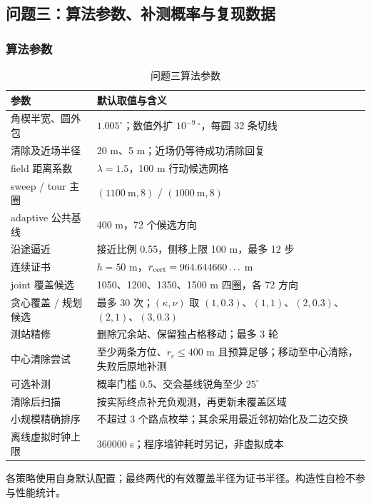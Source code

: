 \subsection{问题三：算法参数、补测概率与复现数据}\label{app:q3repro}
\subsubsection{算法参数}
\begin{table}[H]\centering
\caption{问题三算法参数}
\begin{tabular}{@{}p{}p{}@{}}\toprule
参数 & 默认取值与含义\\\midrule
角楔半宽、圆外包 & $1.005^\circ$；数值外扩 $10^{-9}\,{}^\circ$，每圆 32 条切线\\
清除及近场半径 & 20 m、5 m；近场仍等待成功清除回复\\
field 距离系数 & $\lambda=1.5$，100 m 行动候选网格\\
sweep / tour 主圈 & $(1100\ \mathrm{m},8)$ / $(1000\ \mathrm{m},8)$\\
adaptive 公共基线 & 400 m，72 个候选方向\\
沿途逼近 & 接近比例 0.55，侧移上限 100 m，最多 12 步\\
连续证书 & $h=50$ m，$r_{\rm cert}=964.644660\ldots$ m\\
joint 覆盖候选 & 1050、1200、1350、1500 m 四圈，各 72 方向\\
贪心覆盖 / 规划候选 & 最多 30 次；$(\kappa,\nu)$ 取 $(1,0.3)$、$(1,1)$、$(2,0.3)$、$(2,1)$、$(3,0.3)$\\
测站精修 & 删除冗余站、保留独占格移动；最多 3 轮\\
中心清除尝试 & 至少两条方位、$r_c\le400$ m 且预算足够；移动至中心清除，失败后原地补测\\
可选补测 & 概率门槛 0.5、交会基线锐角至少 $25^\circ$\\
清除后扫描 & 按实际终点补充负观测，再更新未覆盖区域\\
小规模精确排序 & 不超过 3 个路点枚举；其余采用最近邻初始化及二边交换\\
离线虚拟时钟上限 & 360000 s；程序墙钟耗时另记，非虚拟成本\\\bottomrule
\end{tabular}\end{table}
各策略使用自身默认配置；最终两代的有效覆盖半径为证书半径。构造性自检不参与性能统计。

